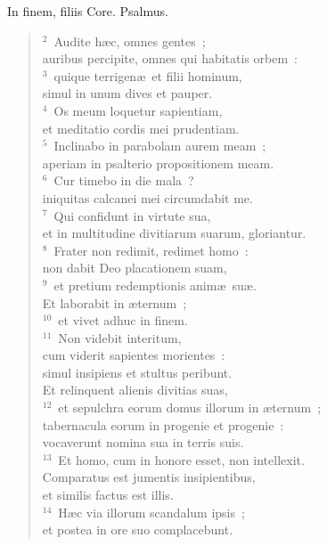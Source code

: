 \bchapter
\lettrine[lines=3,image=true,loversize=0.05,lraise=-0.03]{I}{}n finem, filiis Core. Psalmus.
\begin{flushleft}\begin{verse}\vspace{6pt}${}^{2}$~Audite h\ae c, omnes gentes~;\\ auribus percipite, omnes qui habitatis orbem~:\\
${}^{3}$~quique terrigen\ae\ et filii hominum,\\ simul in unum dives et pauper.\\
${}^{4}$~Os meum loquetur sapientiam,\\ et meditatio cordis mei prudentiam.\\
${}^{5}$~Inclinabo in parabolam aurem meam~;\\ aperiam in psalterio propositionem meam.\\
${}^{6}$~Cur timebo in die mala~?\\ iniquitas calcanei mei circumdabit me.\\
${}^{7}$~Qui confidunt in virtute sua,\\ et in multitudine divitiarum suarum, gloriantur.\\
${}^{8}$~Frater non redimit, redimet homo~:\\ non dabit Deo placationem suam,\\
${}^{9}$~et pretium redemptionis anim\ae\ su\ae .\\ Et laborabit in \ae ternum~;\\
${}^{10}$~et vivet adhuc in finem.\\
${}^{11}$~Non videbit interitum,\\ cum viderit sapientes morientes~:\\ simul insipiens et stultus peribunt.\\ Et relinquent alienis divitias suas,\\
${}^{12}$~et sepulchra eorum domus illorum in \ae ternum~;\\ tabernacula eorum in progenie et progenie~:\\ vocaverunt nomina sua in terris suis.\\
${}^{13}$~Et homo, cum in honore esset, non intellexit.\\ Comparatus est jumentis insipientibus,\\ et similis factus est illis.\\
${}^{14}$~H\ae c via illorum scandalum ipsis~;\\ et postea in ore suo complacebunt.\\

\end{verse}
\end{flushleft}
